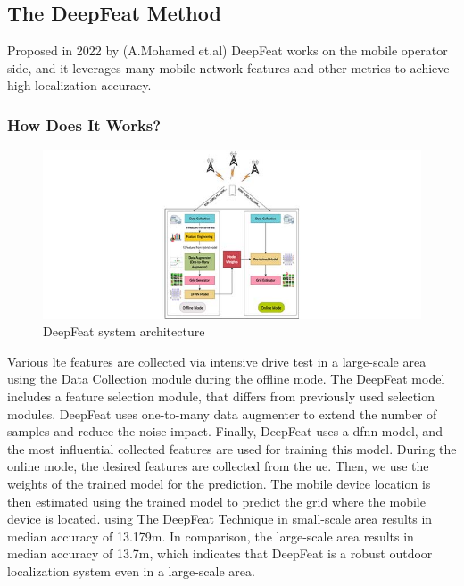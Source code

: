 \subsection{The DeepFeat Method}
Proposed in 2022 by (A.Mohamed et.al)\cite{amel} DeepFeat works on the mobile operator side, and it leverages many mobile network features and other metrics to achieve high localization accuracy.

\subsubsection{How Does It Works?}
\begin{figure}
    \centering
    \includegraphics[scale = 2]{images/access-gagraphic-3140292.jpg}
    \caption{DeepFeat system architecture}
\end{figure}

Various \ac{lte} features are collected via intensive drive test in a large-scale area using the Data Collection module during the offline mode.
The DeepFeat model includes a feature selection module, that differs from previously used selection modules.
DeepFeat uses one-to-many data augmenter to extend the number of samples and reduce the noise impact.
Finally, DeepFeat uses a \ac{dfnn} model, and the most influential collected features are used for training this model.
During the online mode, the desired features are collected from the \ac{ue}.
Then, we use the weights of the trained model for the prediction.
The mobile device location is then estimated using the trained model to predict the grid where the mobile device is located.
using The DeepFeat Technique in small-scale area results in median accuracy of 13.179m.
In comparison, the large-scale area results in median accuracy of 13.7m, which indicates that DeepFeat is a robust outdoor localization system even in a large-scale area.
